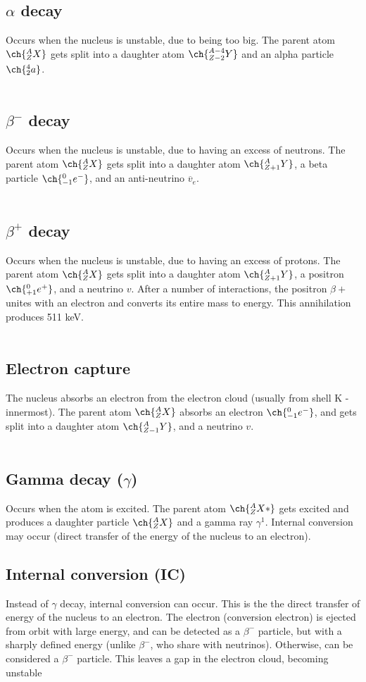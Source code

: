 \subsection{$\alpha$ decay} Occurs when the nucleus is unstable, due to being too big. The parent atom $\ch{^{A}_{Z}X}$ gets split into a daughter atom $\ch{^{A-4}_{Z-2}Y}$ and an alpha particle $\ch{^{4}_{2}a}$.\\\\
\subsection{$\beta^{-}$ decay} Occurs when the nucleus is unstable, due to having an excess of neutrons. The parent atom $\ch{^{A}_{Z}X}$ gets split into a daughter atom $\ch{^{A}_{Z+1}Y}$, a beta particle $\ch{^{0}_{-1}e^{-}}$, and an anti-neutrino $\overline{v}_e$.\\\\
\subsection{$\beta^{+}$ decay} Occurs when the nucleus is unstable, due to having an excess of protons. The parent atom $\ch{^{A}_{Z}X}$ gets split into a daughter atom $\ch{^{A}_{Z+1}Y}$, a positron $\ch{^{0}_{+1}e^{+}}$, and a neutrino $v$. After a number of interactions, the positron $\beta{+}$ unites with an electron and converts its entire mass to energy. This annihilation produces 511 keV.\\\\
\subsection{Electron capture} The nucleus absorbs an electron from the electron cloud (usually from shell K -innermost). The parent atom $\ch{^{A}_{Z}X}$ absorbs an electron $\ch{^{0}_{-1}e^{-}}$, and gets split into a daughter atom $\ch{^{A}_{Z-1}Y}$, and a neutrino $v$.\\\\
\subsection{Gamma decay ($\gamma$)} Occurs when the atom is excited. The parent atom $\ch{^{A}_{Z}X*}$ gets excited and produces a daughter particle $\ch{^{A}_{Z}X}$ and a gamma ray $\gamma^{1}$. Internal conversion may occur (direct transfer of the energy of the nucleus to an electron).
\subsection{Internal conversion (IC)} Instead of $\gamma$ decay, internal conversion can occur. This is the the direct transfer of energy of the nucleus to an electron. The electron (conversion electron) is ejected from orbit with large energy, and can be detected as a $\beta^{-}$ particle, but with a sharply defined energy (unlike $\beta^{-}$, who share with neutrinos). Otherwise, can be considered a $\beta^{-}$ particle. This leaves a gap in the electron cloud, becoming unstable
